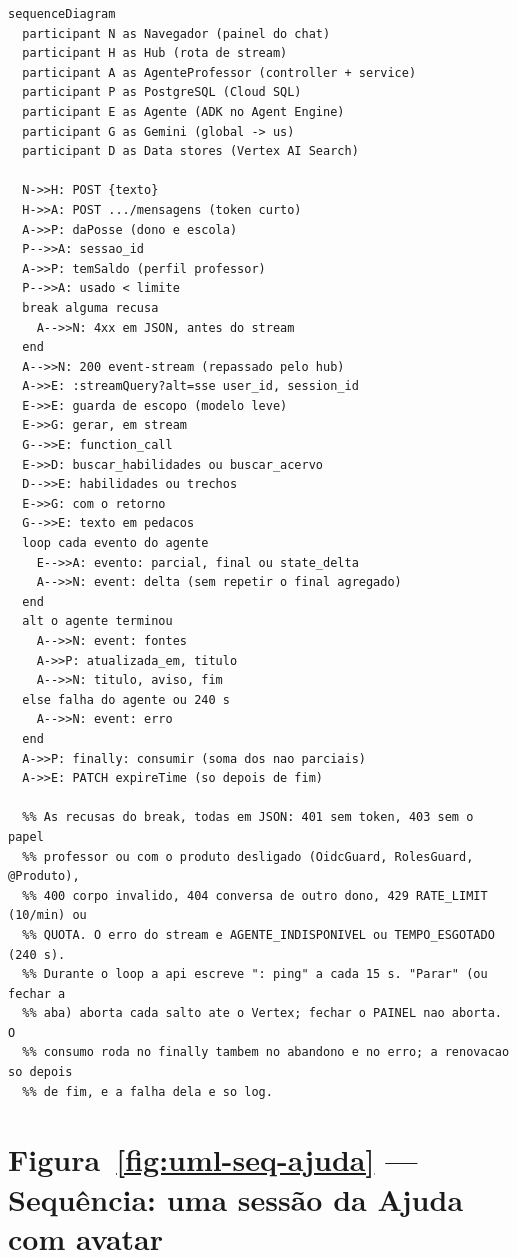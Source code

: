 \begin{lstlisting}[language=mermaid]
sequenceDiagram
  participant N as Navegador (painel do chat)
  participant H as Hub (rota de stream)
  participant A as AgenteProfessor (controller + service)
  participant P as PostgreSQL (Cloud SQL)
  participant E as Agente (ADK no Agent Engine)
  participant G as Gemini (global -> us)
  participant D as Data stores (Vertex AI Search)

  N->>H: POST {texto}
  H->>A: POST .../mensagens (token curto)
  A->>P: daPosse (dono e escola)
  P-->>A: sessao_id
  A->>P: temSaldo (perfil professor)
  P-->>A: usado < limite
  break alguma recusa
    A-->>N: 4xx em JSON, antes do stream
  end
  A-->>N: 200 event-stream (repassado pelo hub)
  A->>E: :streamQuery?alt=sse user_id, session_id
  E->>E: guarda de escopo (modelo leve)
  E->>G: gerar, em stream
  G-->>E: function_call
  E->>D: buscar_habilidades ou buscar_acervo
  D-->>E: habilidades ou trechos
  E->>G: com o retorno
  G-->>E: texto em pedacos
  loop cada evento do agente
    E-->>A: evento: parcial, final ou state_delta
    A-->>N: event: delta (sem repetir o final agregado)
  end
  alt o agente terminou
    A-->>N: event: fontes
    A->>P: atualizada_em, titulo
    A-->>N: titulo, aviso, fim
  else falha do agente ou 240 s
    A-->>N: event: erro
  end
  A->>P: finally: consumir (soma dos nao parciais)
  A->>E: PATCH expireTime (so depois de fim)

  %% As recusas do break, todas em JSON: 401 sem token, 403 sem o papel
  %% professor ou com o produto desligado (OidcGuard, RolesGuard, @Produto),
  %% 400 corpo invalido, 404 conversa de outro dono, 429 RATE_LIMIT (10/min) ou
  %% QUOTA. O erro do stream e AGENTE_INDISPONIVEL ou TEMPO_ESGOTADO (240 s).
  %% Durante o loop a api escreve ": ping" a cada 15 s. "Parar" (ou fechar a
  %% aba) aborta cada salto ate o Vertex; fechar o PAINEL nao aborta. O
  %% consumo roda no finally tambem no abandono e no erro; a renovacao so depois
  %% de fim, e a falha dela e so log.
\end{lstlisting}

\section{Figura~\ref{fig:uml-seq-ajuda} --- Sequência: uma sessão da Ajuda com avatar}

